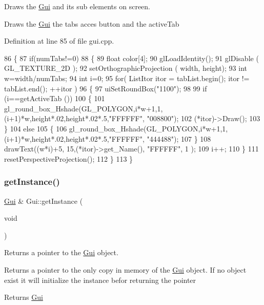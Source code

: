Draws the \hyperlink{class_gui}{Gui} and its sub elements on screen. 

Draws the \hyperlink{class_gui}{Gui} the tabs acces button and the active\+Tab 

Definition at line 85 of file gui.\+cpp.


\begin{DoxyCode}
86 \{
87     \textcolor{keywordflow}{if}(numTabs!=0)
88     \{
89     \textcolor{keywordtype}{float} color[4];
90     glLoadIdentity();
91     glDisable ( GL\_TEXTURE\_2D );
92     setOrthographicProjection ( width, height);
93     \textcolor{keywordtype}{int} w=width/numTabs;
94     \textcolor{keywordtype}{int} i=0;
95     \textcolor{keywordflow}{for}( ListItor itor = tabList.begin(); itor != tabList.end(); ++itor )
96     \{
97         uiSetRoundBox(\textcolor{stringliteral}{"1100"});
98         
99         \textcolor{keywordflow}{if} (i==getActiveTab ())
100         \{
101             gl\_round\_box\_Hshade(GL\_POLYGON,i*w+1,1,(i+1)*w,height*.02,height*.02*.5,\textcolor{stringliteral}{"FFFFFF"}, \textcolor{stringliteral}{"008800"});
102             (*itor)->Draw();
103         \}
104         \textcolor{keywordflow}{else}
105         \{
106             gl\_round\_box\_Hshade(GL\_POLYGON,i*w+1,1,(i+1)*w,height*.02,height*.02*.5,\textcolor{stringliteral}{"FFFFFF"}, \textcolor{stringliteral}{"444488"});
107         \}
108         drawText((w*i)+5, 15,(*itor)->get\_Name(), \textcolor{stringliteral}{"FFFFFF"}, 1 );
109         i++;
110     \}
111     resetPerspectiveProjection();
112     \}
113 \}
\end{DoxyCode}
\mbox{\label{class_gui_a613c787488c374d68a04886cc63127a7}} 
\subsubsection{\texorpdfstring{get\+Instance()}{getInstance()}}
{\footnotesize\ttfamily \hyperlink{class_gui}{Gui} \& Gui\+::get\+Instance (\begin{DoxyParamCaption}\item[{void}]{ }\end{DoxyParamCaption})\hspace{0.3cm}{\ttfamily [static]}}



Returns a pointer to the \hyperlink{class_gui}{Gui} object. 

Returns a pointer to the only copy in memory of the \hyperlink{class_gui}{Gui} object. If no object exist it will initialize the instance befor returning the pointer \begin{DoxyReturn}{Returns}
\hyperlink{class_gui}{Gui} 
\end{DoxyReturn}



